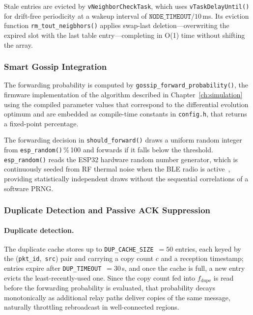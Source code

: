 \documentclass[english,bachelor]{tfgitic}[2026/01/22]
\begin{document}
Stale entries are evicted by \texttt{vNeighborCheckTask}, which uses
\texttt{vTaskDelayUntil()} for drift-free periodicity at a wakeup interval of
$\texttt{NODE\_TIMEOUT} / 10$\,ms. Its eviction function \texttt{rm\_tout\_neigbhors()}
applies swap-last deletion---overwriting the expired slot with the last table
entry---completing in O(1) time without shifting the array.

\subsubsection{Smart Gossip Integration}
\label{sec:fw_smartgossip}

The forwarding probability is computed by \texttt{gossip\_forward\_probability()},
the firmware implementation of the algorithm described in
Chapter~\ref{ch:simulation} using the compiled parameter values that correspond to
the differential evolution optimum and are embedded as compile-time constants in
\texttt{config.h}, that returns a fixed-point percentage.

The forwarding decision in
\texttt{should\_forward()} draws a uniform random integer from
\texttt{esp\_random()}\,\%\,100 and forwards if it falls below the threshold.
\texttt{esp\_random()} reads the ESP32 hardware random number generator, which is
continuously seeded from RF thermal noise when the BLE radio is
active~\cite{espressif2023esp32trm}, providing statistically independent draws
without the sequential correlations of a software PRNG.

\subsubsection{Duplicate Detection and Passive ACK Suppression}
\label{sec:fw_passive_ack}

\paragraph{Duplicate detection.}
The duplicate cache stores up to \texttt{DUP\_CACHE\_SIZE}~$= 50$ entries, each
keyed by the (\texttt{pkt\_id},~\texttt{src}) pair and carrying a copy count $c$ and
a reception timestamp; entries expire after \texttt{DUP\_TIMEOUT}~$= 30$\,s, and
once the cache is full, a new entry evicts the least-recently-used one. Since the
copy count fed into $f_{\mathrm{dupe}}$ is read before the forwarding probability is
evaluated, that probability decays monotonically as additional relay paths deliver
copies of the same message, naturally throttling rebroadcast in well-connected
regions.
\end{document}
